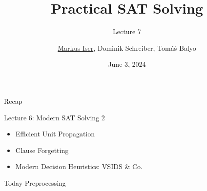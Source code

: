 \documentclass[t]{sdqbeamer}
\title[SAT Solving]{Practical SAT Solving}
\subtitle{Lecture 7}
\author{\underline{Markus Iser}, Dominik Schreiber, Tom\'a\v{s} Balyo}
\date{June 3, 2024}
\begin{document}
\begin{frame}
	\thispagestyle{empty}
	\titlepage
\end{frame}


\begin{frame}{Recap}
    \begin{block}{Lecture 6: Modern SAT Solving 2}
		\begin{itemize}\setlength{\itemsep}{1ex}
			\item Efficient Unit Propagation
			\item Clause Forgetting
			\item Modern Decision Heuristics: VSIDS \& Co.
		\end{itemize}
    \end{block}
	\begin{block}{Today}
        Preprocessing
	\end{block}
\end{frame}
\end{document}
